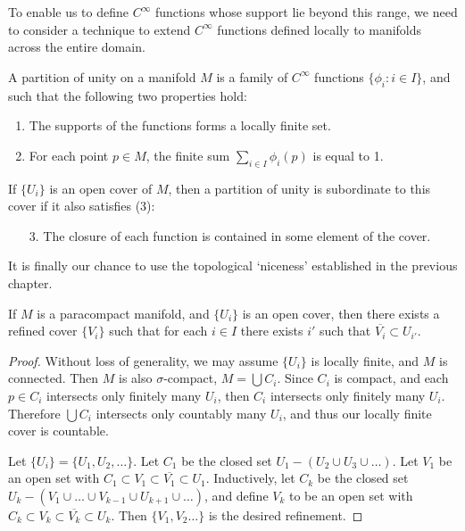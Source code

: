 To enable us to define $C^\infty$ functions whose support lie beyond this range, we need to consider a technique to extend $C^\infty$ functions defined locally to manifolds across the entire domain.

\begin{definition}
    A partition of unity on a manifold $M$ is a family of $C^\infty$ functions $\{ \phi_i : i \in I \}$, and such that the following two properties hold:
    \begin{enumerate}
        \item The supports of the functions forms a locally finite set.
        \item For each point $p \in M$, the finite sum $\sum_{i \in I} \phi_i(p)$ is equal to 1.
    \end{enumerate}
    If $\{ U_i \}$ is an open cover of $M$, then a partition of unity is subordinate to this cover if it also satisfies (3):
    \begin{enumerate}
        \item[3.] The closure of each function is contained in some element of the cover.
    \end{enumerate}
\end{definition}

It is finally our chance to use the topological `niceness' established in the previous chapter.

\begin{lemma}
    If $M$ is a paracompact manifold, and $\{ U_i \}$ is an open cover, then there exists a refined cover $\{ V_i \}$ such that for each $i \in I$ there exists $i'$ such that $\overline{V_i} \subset U_{i'}$.
\end{lemma}
\begin{proof}
    Without loss of generality, we may assume $\{ U_i \}$ is locally finite, and $M$ is connected. Then $M$ is also $\sigma$-compact, $M = \bigcup C_i$. Since $C_i$ is compact, and each $p \in C_i$ intersects only finitely many $U_i$, then $C_i$ intersects only finitely many $U_i$. Therefore $\bigcup C_i$ intersects only countably many $U_i$, and thus our locally finite cover is countable.

    Let $\{ U_i \} = \{ U_1, U_2, \dots \}$. Let $C_1$ be the closed set $U_1 - (U_2 \cup U_3 \cup \dots)$. Let $V_1$ be an open set with $C_1 \subset V_1 \subset \overline{V_1} \subset U_1$. Inductively, let $C_k$ be the closed set $U_k - (V_1 \cup \dots \cup V_{k-1} \cup U_{k+1} \cup \dots)$, and define $V_k$ to be an open set with $C_k \subset V_k \subset \overline{V_k} \subset U_k$. Then $\{ V_1, V_2 \dots \}$ is the desired refinement.
\end{proof}

